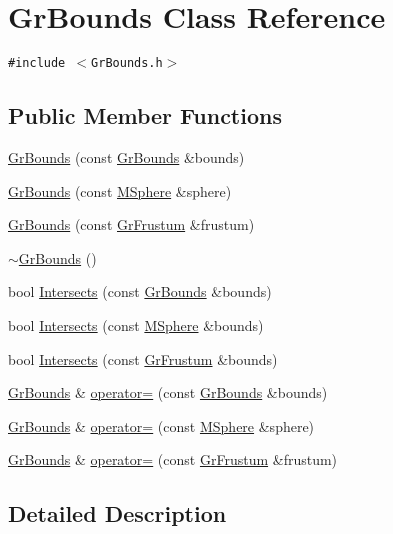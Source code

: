 \hypertarget{class_gr_bounds}{
\section{GrBounds Class Reference}
\label{class_gr_bounds}
}
{\tt \#include $<$GrBounds.h$>$}

\subsection*{Public Member Functions}
\begin{CompactItemize}
\item 
\hyperlink{class_gr_bounds_a97153d6b3daf25ac80e354056c04b16}{GrBounds} (const \hyperlink{class_gr_bounds}{GrBounds} \&bounds)
\item 
\hyperlink{class_gr_bounds_e752149dfcef2c99dd72e168b5caec09}{GrBounds} (const \hyperlink{class_m_sphere}{MSphere} \&sphere)
\item 
\hyperlink{class_gr_bounds_2483e4edd983af5995ad2696fcc04299}{GrBounds} (const \hyperlink{class_gr_frustum}{GrFrustum} \&frustum)
\item 
\hyperlink{class_gr_bounds_85739bbb8c8b44e95606b996e8fc576d}{$\sim$GrBounds} ()
\item 
bool \hyperlink{class_gr_bounds_194728e6b450789f0b5b1e5e75dfe823}{Intersects} (const \hyperlink{class_gr_bounds}{GrBounds} \&bounds)
\item 
bool \hyperlink{class_gr_bounds_db5280ffd3439b0373f2f0be3726eac3}{Intersects} (const \hyperlink{class_m_sphere}{MSphere} \&bounds)
\item 
bool \hyperlink{class_gr_bounds_6b254718d7b9e125d7f53b950a7f3a77}{Intersects} (const \hyperlink{class_gr_frustum}{GrFrustum} \&bounds)
\item 
\hyperlink{class_gr_bounds}{GrBounds} \& \hyperlink{class_gr_bounds_893faa22e5cf17eebd344cf25ef2c6d8}{operator=} (const \hyperlink{class_gr_bounds}{GrBounds} \&bounds)
\item 
\hyperlink{class_gr_bounds}{GrBounds} \& \hyperlink{class_gr_bounds_bee924f5ceffe07812582bc17a04eabe}{operator=} (const \hyperlink{class_m_sphere}{MSphere} \&sphere)
\item 
\hyperlink{class_gr_bounds}{GrBounds} \& \hyperlink{class_gr_bounds_4c11fbe01c84a5770516da4cc85d1e38}{operator=} (const \hyperlink{class_gr_frustum}{GrFrustum} \&frustum)
\end{CompactItemize}


\subsection{Detailed Description}


